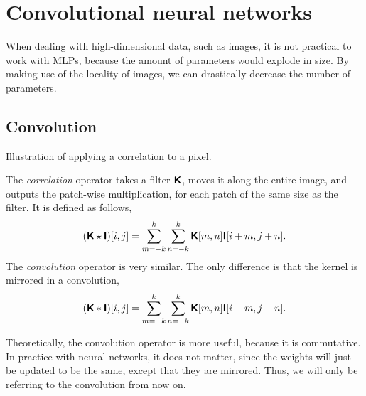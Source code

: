 \section{Convolutional neural networks}

When dealing with high-dimensional data, such as images, it is not practical to work with MLPs,
because the amount of parameters would explode in size. By
making use of the locality of images, we can drastically decrease the number of parameters.

\subsection{Convolution}

\begin{marginfigure}
    \centering
    \caption{Illustration of applying a correlation to a pixel.}
    \label{fig:correlation}
\end{marginfigure}

The \textit{correlation} operator takes a filter $\bm{\mathsf{K}}$, moves it along the entire image, and
outputs the patch-wise multiplication, for each patch of the same size as the filter. It is defined
as follows, \[
    (\bm{\mathsf{K}} \star \bm{\mathsf{I}})[i,j] = \sum_{m=-k}^{k} \sum_{n=-k}^{k} \bm{\mathsf{K}}[m, n] \bm{\mathsf{I}}[i+m, j+n].
\]
The \textit{convolution} operator is very similar. The only difference is that the kernel is
mirrored in a convolution, \[
    (\bm{\mathsf{K}} * \bm{\mathsf{I}})[i,j] = \sum_{m=-k}^k \sum_{n=-k}^{k} \bm{\mathsf{K}}[m,n] \bm{\mathsf{I}}[i-m, j-n].
\]

Theoretically, the convolution operator is more useful, because it is
commutative. In practice with neural networks, it does not matter, since the
weights will just be updated to be the same, except that they are mirrored. Thus, we will only be
referring to the convolution from now on.

